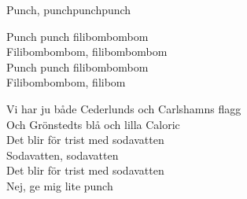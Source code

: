 \begin{song}{Punch, punch}{punchpunch}
\begin{vers}
Punch punch filibombombom\\
Filibombombom, filibombombom\\
Punch punch filibombombom\\
Filibombombom, filibom\\
\end{vers}
\begin{vers}
Vi har ju både Cederlunds och Carlshamns flagg\\
Och Grönstedts blå och lilla Caloric\\
Det blir för trist med sodavatten\\
Sodavatten, sodavatten\\
Det blir för trist med sodavatten\\
Nej, ge mig lite punch\\
\end{vers}
\end{song}
